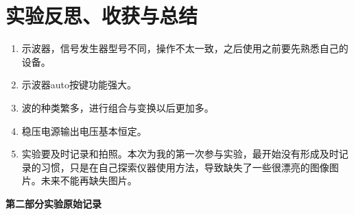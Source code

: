 \documentclass[11pt]{article}
\begin{document}
\begin{enumerate}
\begin{enumerate}
    \end{enumerate}
\end{enumerate}

\section{实验反思、收获与总结}
\begin{enumerate}
    \item 示波器，信号发生器型号不同，操作不太一致，之后使用之前要先熟悉自己的设备。
    \item 示波器auto按键功能强大。
    \item 波的种类繁多，进行组合与变换以后更加多。
    \item 稳压电源输出电压基本恒定。
    \item 实验要及时记录和拍照。本次为我的第一次参与实验，最开始没有形成及时记录的习惯，只是在自己探索仪器使用方法，导致缺失了一些很漂亮的图像图片。未来不能再缺失图片。
\end{enumerate}


\begin{center}
    \vspace*{1em}
    \Large \bf 第二部分\qquad 实验原始记录
\end{center}
\end{document}
